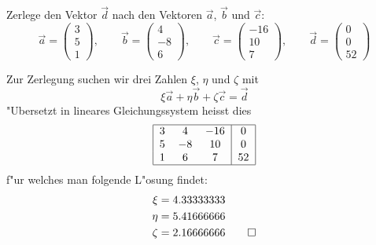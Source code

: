Zerlege den Vektor $\vec d$ nach den Vektoren $\vec a$, $\vec b$ und $\vec c$:
\[
\vec a=\begin{pmatrix}3\\5\\1\end{pmatrix},\qquad
\vec b=\begin{pmatrix}4\\-8\\6\end{pmatrix},\qquad
\vec c=\begin{pmatrix}-16\\10\\7\end{pmatrix},\qquad
\vec d=\begin{pmatrix}0\\0\\52\end{pmatrix}
\]

\begin{loesung}
Zur Zerlegung suchen wir drei Zahlen $\xi$, $\eta$ und $\zeta$ mit
\[
\xi \vec a
+
\eta \vec b
+
\zeta \vec c
=
\vec d
\]
"Ubersetzt in lineares Gleichungssystem heisst dies
\[
\begin{tabular}{|ccc|c|}
\hline
3&4&$-16$&0\\
5&$-8$&10&0\\
1&6&7&52\\
\hline
\end{tabular}
\]
f"ur welches man folgende L"osung findet:
\begin{align*}
\xi&=4.33333333\\
\eta&=5.41666666\\
\zeta&=2.16666666
\qedhere
\end{align*}
\end{loesung}

